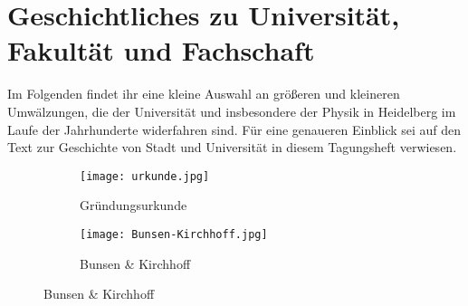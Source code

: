 
\section[Geschichtliches]{Geschichtliches zu Universität, Fakultät und Fachschaft}
Im Folgenden findet ihr eine kleine Auswahl an größeren und kleineren Umwälzungen, die der Universität und insbesondere der Physik in Heidelberg im Laufe der Jahrhunderte widerfahren sind. Für eine genaueren Einblick sei auf den Text zur Geschichte von Stadt und Universität in diesem Tagungsheft verwiesen.\\

\begin{figure}[h]
\captionsetup[subfigure]{labelformat=empty} 
\begin{subfigure}{0.53\textwidth}
\texttt{[image: urkunde.jpg]} 
\caption{Gründungsurkunde}
\end{subfigure}
\begin{subfigure}{0.43\textwidth}
\texttt{[image: Bunsen-Kirchhoff.jpg]}
\caption{Bunsen \& Kirchhoff}
\end{subfigure}
\end{figure}

